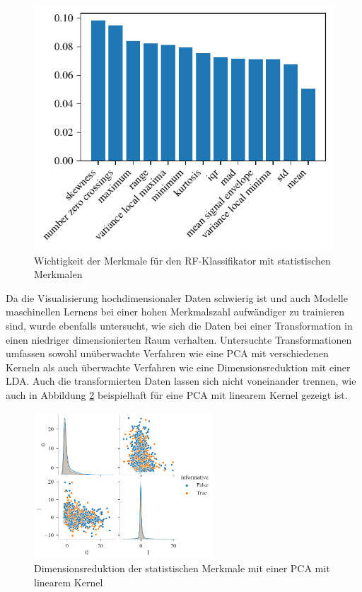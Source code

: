\begin{figure}[H]
	\centering
	\includegraphics[scale=0.95]{pic/rf-cl-statistical.pdf}
	\caption{Wichtigkeit der Merkmale für den \ac{RF}-Klassifikator mit statistischen Merkmalen}
	\label{fig:rf-statistical-importances}
\end{figure}

Da die Visualisierung hochdimensionaler Daten schwierig ist und auch Modelle maschinellen Lernens bei einer hohen Merkmalszahl aufwändiger zu trainieren sind, wurde ebenfalls untersucht, wie sich die Daten bei einer Transformation in einen niedriger dimensionierten Raum verhalten. Untersuchte Transformationen umfassen sowohl unüberwachte Verfahren wie eine \ac{PCA} mit verschiedenen Kerneln als auch überwachte Verfahren wie eine Dimensionsreduktion mit einer \ac{LDA}. Auch die transformierten Daten lassen sich nicht voneinander trennen, wie auch in Abbildung \ref{fig:dim-red-statistical} beispielhaft für eine \ac{PCA} mit linearem Kernel gezeigt ist.


 \begin{figure}[H]
 	\centering
 	\includegraphics[width=0.6\textwidth]{pic/statistical-pca-lin.pdf}
	\caption{Dimensionsreduktion der statistischen Merkmale mit einer \ac{PCA} mit linearem Kernel}
	\label{fig:dim-red-statistical}
\end{figure}

